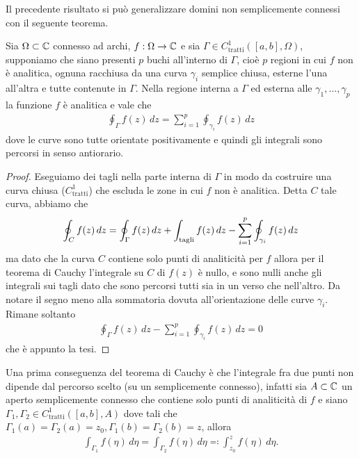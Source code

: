 Il precedente risultato si può generalizzare domini non semplicemente connessi con il seguente teorema.
\begin{theorem}[  ] \label{thm: di Cauchy in un connesso ad archi}
  Sia $ \Omega \subset \mathbb{C} $ connesso ad archi, $ f:\Omega \to \mathbb{C} $ e sia $ \Gamma \in C^1_{\text{tratti}}([a,b], \Omega) $, 
  supponiamo che siano presenti $ p $ buchi all'interno di $ \Gamma $, cioè $ p $ regioni in cui $ f $ non è analitica, ognuna racchiusa da una curva 
  $ \gamma_i $ semplice chiusa, esterne l'una all'altra e tutte contenute in $ \Gamma $. Nella regione interna a $ \Gamma $ ed esterna alle 
  $ \gamma_1, \dots, \gamma_p $ la funzione $ f $ è analitica e vale che
  \begin{align}
    \oint_\Gamma f(z) \,dz = \sum_{i = 1}^p \oint_{\gamma_i} f(z) \,dz
  \end{align}
  dove le curve sono tutte orientate positivamente e quindi gli integrali sono percorsi in senso antiorario.
\end{theorem}
\begin{proof}
  Eseguiamo dei tagli nella parte interna di $ \Gamma $ in modo da costruire una curva chiusa ($ C^1_{\text{tratti}} $) che escluda le zone in cui $ f $ 
  non è analitica. Detta $ C $ tale curva, abbiamo che 
  \begin{align}
    \oint_C f(z) \,dz = \oint_\Gamma f(z)\,dz + \int_{\textnormal{tagli}} f(z)\, dz - \sum_{i = 1}^p \oint_{\gamma_i} f(z) \,dz
  \end{align}
  ma dato che la curva $ C $ contiene solo punti di analiticità per $ f $ allora per il teorema di Cauchy l'integrale su $ C $ di $ f(z) $ è nullo, 
  e sono nulli anche gli integrali sui tagli dato che sono percorsi tutti sia in un verso che nell'altro. Da notare il segno meno alla sommatoria dovuta 
  all'orientazione delle curve $ \gamma_i $. Rimane soltanto  
  \begin{align}
    \oint_\Gamma f(z)\,dz - \sum_{i = 1}^p \oint_{\gamma_i} f(z) \,dz = 0
  \end{align}
  che è appunto la tesi.
\end{proof}

Una prima conseguenza del teorema di Cauchy è che l'integrale fra due punti non dipende dal percorso scelto (su un semplicemente connesso), infatti sia 
$ A\subset \mathbb{C}$ un aperto semplicemente connesso che contiene solo punti di analiticità di $ f $ e siano 
$ \Gamma_1, \Gamma_2 \in C^1_{\text{tratti}}([a,b], A) $ dove tali che $ \Gamma_1(a) = \Gamma_2(a) = z_0, \Gamma_1(b) = \Gamma_2(b) = z $, allora
\begin{align}
  \int_{\Gamma_1} f(\eta) \,d\eta = \int_{\Gamma_2} f(\eta) \,d\eta \eqcolon \int_{z_0}^z f(\eta) \,d\eta.
\end{align}

